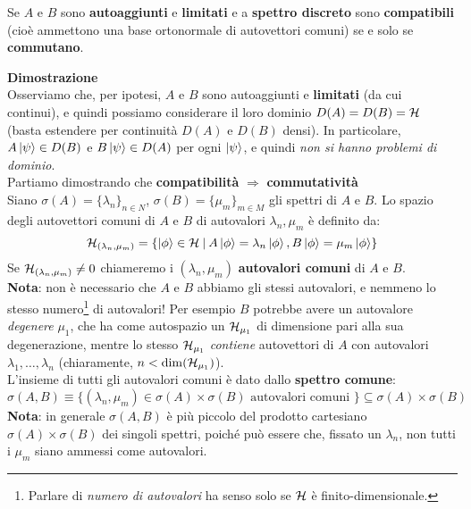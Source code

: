 \documentclass[../../FisicaTeorica.tex]{subfiles}
\begin{document}
\begin{thm}
Se $A$ e $B$ sono \textbf{autoaggiunti} e \textbf{limitati} e a \textbf{spettro discreto} sono \textbf{compatibili} (cioè ammettono una base ortonormale di autovettori comuni) se e solo se \textbf{commutano}.\ \end{thm}
\textbf{Dimostrazione}\\
Osserviamo che, per ipotesi, $A$ e $B$ sono autoaggiunti e \textbf{limitati} (da cui continui), e quindi possiamo considerare il loro dominio $D(A)=D(B)=\mathcal{H}$ (basta estendere per continuità $D(A)$ e $D(B)$ densi). In particolare, $A\Ket{\psi} \in D(B)$ e $B\Ket{\psi} \in D(A)$ per ogni $\Ket{\psi}$, e quindi \textit{non si hanno problemi di dominio}.\\

Partiamo dimostrando che \textbf{compatibilità} $\Rightarrow$ \textbf{commutatività}\\
Siano $\sigma(A)=\{\lambda_n\}_{n\in N}$, $\sigma(B)=\{\mu_m\}_{m\in M}$ gli spettri di $A$ e $B$. Lo spazio degli autovettori comuni di $A$ e $B$ di autovalori $\lambda_n, \mu_m$ è definito da:
\[
\mathcal{H}_{(\lambda_n, \mu_m)}=\{\Ket{\phi}\in \mathcal{H}\>|\> A\Ket{\phi}=\lambda_n \Ket{\phi}, 
B\Ket{\phi}=\mu_m \Ket{\phi}
\}
\]
Se $\mathcal{H}_{(\lambda_n, \mu_m)}\neq 0$ chiameremo i $(\lambda_n, \mu_m)$ \textbf{autovalori comuni} di $A$ e $B$.\\


\textbf{Nota}: non è necessario che $A$ e $B$ abbiamo gli stessi autovalori, e nemmeno lo stesso numero\footnote{Parlare di \textit{numero di autovalori} ha senso solo se $\mathcal{H}$ è finito-dimensionale.} di autovalori! Per esempio $B$ potrebbe avere un autovalore \textit{degenere} $\mu_1$, che ha come autospazio un $\mathcal{H}_{\mu_1}$ di dimensione pari alla sua degenerazione, mentre lo stesso $\mathcal{H}_{\mu_1}$ \textit{contiene} autovettori di $A$ con autovalori $\lambda_1, \dots, \lambda_n$ (chiaramente, $n < \operatorname{dim}(\mathcal{H}_{\mu_1})$).\\

 L'insieme di tutti gli autovalori comuni è dato dallo \textbf{spettro comune}:
\[
\sigma(A,B)\equiv \{
(\lambda_n, \mu_m) \in \sigma(A) \times \sigma(B) \text{ autovalori comuni }
\} \subseteq \sigma(A)\times \sigma(B)
\]
\textbf{Nota}: in generale $\sigma(A,B)$ è più piccolo del prodotto cartesiano $\sigma(A)\times \sigma(B)$ dei singoli spettri, poiché può essere che, fissato un $\lambda_n$, non tutti i $\mu_m$ siano ammessi come autovalori.\\
\end{document}
